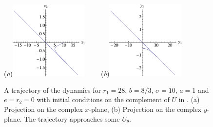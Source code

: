 \begin{figure}[t]
\begin{center}
  (\textit{a})\includegraphics[width=0.35\textwidth]{../figs/CLe0transA.eps}
~~~~(\textit{b})\includegraphics[width=0.35\textwidth]{../figs/CLe0transB.eps}
\end{center}
\caption[Transient trajectory in degenerate Complex Lorenz eq.]{ A trajectory
of the \CLe dynamics for $r_1=28,\, b=8/3,\, \sigma=10,\, a=1$ and $e=r_2=0$ with
initial conditions on the complement of $U$ in . (a) Projection on the
complex $x$-plane, (b) Projection on the complex $y$-plane. The trajectory
approaches some $U_\theta$.
    }
\label{fig:LorenzCoex}
\end{figure}

